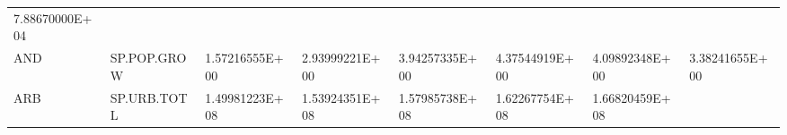 \documentclass[]{article}
\begin{document}
\begin{longtable}[]{@{}llllllll@{}}
\begin{minipage}[t]{0.11\columnwidth}
7.88670000E+04\strut
\end{minipage}\tabularnewline
\begin{minipage}[t]{0.06\columnwidth}\raggedright
AND\strut
\end{minipage} & \begin{minipage}[t]{0.08\columnwidth}\raggedright
SP.POP.GROW\strut
\end{minipage} & \begin{minipage}[t]{0.11\columnwidth}\raggedright
1.57216555E+00\strut
\end{minipage} & \begin{minipage}[t]{0.11\columnwidth}\raggedright
2.93999221E+00\strut
\end{minipage} & \begin{minipage}[t]{0.11\columnwidth}\raggedright
3.94257335E+00\strut
\end{minipage} & \begin{minipage}[t]{0.11\columnwidth}\raggedright
4.37544919E+00\strut
\end{minipage} & \begin{minipage}[t]{0.11\columnwidth}\raggedright
4.09892348E+00\strut
\end{minipage} & \begin{minipage}[t]{0.11\columnwidth}\raggedright
3.38241655E+00\strut
\end{minipage}\tabularnewline
\begin{minipage}[t]{0.06\columnwidth}\raggedright
ARB\strut
\end{minipage} & \begin{minipage}[t]{0.08\columnwidth}\raggedright
SP.URB.TOTL\strut
\end{minipage} & \begin{minipage}[t]{0.11\columnwidth}\raggedright
1.49981223E+08\strut
\end{minipage} & \begin{minipage}[t]{0.11\columnwidth}\raggedright
1.53924351E+08\strut
\end{minipage} & \begin{minipage}[t]{0.11\columnwidth}\raggedright
1.57985738E+08\strut
\end{minipage} & \begin{minipage}[t]{0.11\columnwidth}\raggedright
1.62267754E+08\strut
\end{minipage} & \begin{minipage}[t]{0.11\columnwidth}\raggedright
1.66820459E+08\strut
\end{minipage} & \begin{minipage}[t]{0.11\columnwidth}\raggedright

\end{minipage}
\end{longtable}
\end{document}
